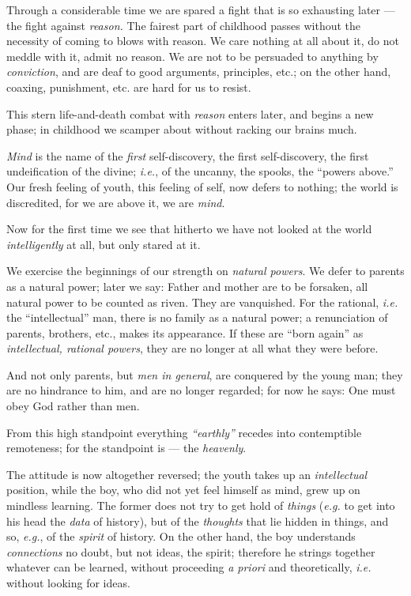 Through a considerable time we are spared a fight that is so exhausting later --- the fight against \textit{reason.} The fairest part of childhood passes 
without the necessity of coming to blows with reason. We care nothing at all 
about it, do not meddle with it, admit no reason. We are not to be persuaded 
to anything by \textit{conviction}, and are deaf to good arguments, 
principles, etc.; on the other hand, coaxing, punishment, etc. are hard for us 
to resist.

This stern life-and-death combat with \textit{reason} enters later, and begins 
a new phase; in childhood we scamper about without racking our brains much.

\textit{Mind} is the name of the \textit{first} self-discovery, the first 
self-discovery, the first undeification of the divine; \textit{i.e.}, of the 
uncanny, the spooks, the ``powers above.'' Our fresh feeling of youth, this 
feeling of self, now defers to nothing; the world is discredited, for we are 
above it, we are \textit{mind}.

Now for the first time we see that hitherto we have not looked at the world 
\textit{intelligently} at all, but only stared at it.

We exercise the beginnings of our strength on \textit{natural powers}. We 
defer to parents as a natural power; later we say: Father and mother are to be 
forsaken, all natural power to be counted as riven. They are vanquished. For 
the rational, \textit{i.e.} the ``intellectual'' man, there is no family as 
a natural power; a renunciation of parents, brothers, etc., makes its 
appearance. If these are ``born again'' as \textit{intellectual, rational 
powers}, they are no longer at all what they were before.

And not only parents, but \textit{men in general}, are conquered by the young 
man; they are no hindrance to him, and are no longer regarded; for now he 
says: One must obey God rather than men.

From this high standpoint everything \textit{``earthly''} recedes into 
contemptible remoteness; for the standpoint is --- the \textit{heavenly}.

The attitude is now altogether reversed; the youth takes up an 
\textit{intellectual} position, while the boy, who did not yet feel himself as 
mind, grew up on mindless learning. The former does not try to get hold of 
\textit{things} (\textit{e.g.} to get into his head the \textit{data} of 
history), but of the \textit{thoughts} that lie hidden in things, and so, 
\textit{e.g.}, of the \textit{spirit} of history. On the other hand, the boy 
understands \textit{connections} no doubt, but not ideas, the spirit; 
therefore he strings together whatever can be learned, without proceeding 
\textit{a priori} and theoretically, \textit{i.e.} without looking for ideas.

